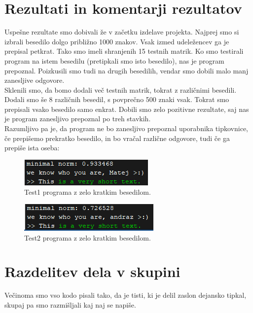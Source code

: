 \documentclass[12pt]{article}
\begin{document}
\section{Rezultati in komentarji rezultatov}
Uspešne rezultate smo dobivali že v začetku izdelave projekta. Najprej smo si izbrali besedilo dolgo 
približno 1000 znakov. Vsak izmed udeležencev ga je prepisal petkrat. Tako smo imeli shranjenih 15 testnih 
matrik. Ko smo testirali program na istem besedilu (pretipkali smo isto besedilo), nas je program prepoznal. 
Poizkusili smo tudi na drugih besedilih, vendar smo dobili malo manj zanesljive odgovore. \\
\newline
Sklenili smo, da bomo dodali več testnih matrik, tokrat z različnimi besedili. Dodali smo še 8 različnih besedil, 
s povprečno 500 znaki vsak. Tokrat smo prepisali vsako besedilo samo enkrat. Dobili smo zelo pozitivne rezultate, 
saj nas je program zanesljivo prepoznal po treh stavkih. \\
\newline
Razumljivo pa je, da program ne bo zanesljivo prepoznal uporabnika tipkovnice, če prepišemo prekratko besedilo, in bo 
vračal različne odgovore, tudi če ga prepiše ista oseba:
\begin{figure}[h]
             \centering
             \includegraphics{correct_guy}
             \caption{Test1 programa z zelo kratkim besedilom.}
\end{figure}

\begin{figure}[h]
             \centering
             \includegraphics{wrong_guy}
             \caption{Test2 programa z zelo kratkim besedilom.}
\end{figure}

\section{Razdelitev dela v skupini}
Večinoma smo vso kodo pisali tako, da je tisti, ki je delil zaslon dejansko tipkal,
skupaj pa smo razmišljali kaj naj se napiše. 
\end{document}
